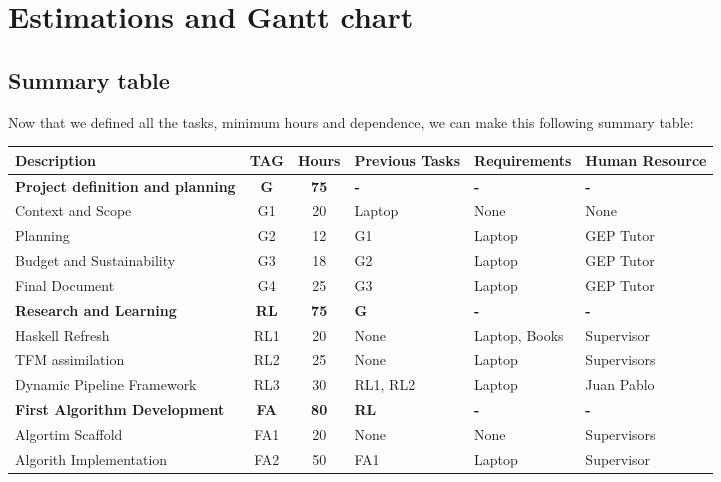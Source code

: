 \chapter{Estimations and Gantt chart}
\section{Summary table}
Now that we defined all the tasks, minimum hours and dependence, we can make this following summary table:
\begin{table}[H]
    \begin{adjustwidth}{-1in}{-1in}
    \centering
    \begin{tabular}{|p{5cm}|c|c|p{2cm}|p{3cm}|p{3cm}|}
    \hline
    \textbf{Description} & \textbf{TAG} & \textbf{Hours} & \textbf{Previous Tasks} & \textbf{Requirements} & \textbf{Human Resource} \\
    \hline
    \hline	
    \rowcolor{LightGray}
    \textbf{Project definition and planning} & \textbf{G} & \textbf{75} & \textbf{-} & \textbf{-} & \textbf{-}  \\
    \hline
    Context and Scope & G1 & 20 & Laptop & None & None \\
    \hline
    Planning & G2 & 12 & G1 & Laptop & GEP Tutor \\
    \hline
    Budget and Sustainability & G3 & 18 & G2 & Laptop & GEP Tutor \\
    \hline
    Final Document & G4 & 25 & G3 & Laptop & GEP Tutor \\
    \hline
    \hline
    \rowcolor{LightGray}
    \textbf{Research and Learning} & \textbf{RL} & \textbf{75} & \textbf{G} & \textbf{-} & \textbf{-} \\
    \hline
    Haskell Refresh & RL1 & 20 & None & Laptop, Books & Supervisor \\
    \hline
    TFM assimilation & RL2 & 25 & None & Laptop & Supervisors \\
    \hline
    Dynamic Pipeline Framework & RL3 & 30 & RL1, RL2 & Laptop & Juan Pablo \\
    \hline
    \hline
    \rowcolor{LightGray}
    \textbf{First Algorithm Development} & \textbf{FA} & \textbf{80} & \textbf{RL} & \textbf{-} & \textbf{-} \\
    \hline
    Algortim Scaffold & FA1 & 20 & None & None & Supervisors\\
    \hline
    Algorith Implementation & FA2 & 50 & FA1 & Laptop & Supervisor\\
    \hline

\end{tabular}
\end{adjustwidth}
\end{table}
